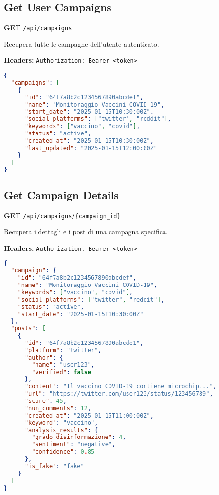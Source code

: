\documentclass[12pt,a4paper]{report}
\begin{document}
\subsection{Get User Campaigns}

\textbf{GET} \texttt{/api/campaigns}

Recupera tutte le campagne dell'utente autenticato.

\textbf{Headers:} \texttt{Authorization: Bearer <token>}

\begin{lstlisting}[language=json, caption=Response (200 OK)]
{
  "campaigns": [
    {
      "id": "64f7a8b2c1234567890abcdef",
      "name": "Monitoraggio Vaccini COVID-19",
      "start_date": "2025-01-15T10:30:00Z",
      "social_platforms": ["twitter", "reddit"],
      "keywords": ["vaccino", "covid"],
      "status": "active",
      "created_at": "2025-01-15T10:30:00Z",
      "last_updated": "2025-01-15T12:00:00Z"
    }
  ]
}
\end{lstlisting}

\subsection{Get Campaign Details}

\textbf{GET} \texttt{/api/campaigns/\{campaign\_id\}}

Recupera i dettagli e i post di una campagna specifica.

\textbf{Headers:} \texttt{Authorization: Bearer <token>}

\begin{lstlisting}[language=json, caption=Response (200 OK)]
{
  "campaign": {
    "id": "64f7a8b2c1234567890abcdef",
    "name": "Monitoraggio Vaccini COVID-19",
    "keywords": ["vaccino", "covid"],
    "social_platforms": ["twitter", "reddit"],
    "status": "active",
    "start_date": "2025-01-15T10:30:00Z"
  },
  "posts": [
    {
      "id": "64f7a8b2c1234567890abcde1",
      "platform": "twitter",
      "author": {
        "name": "user123",
        "verified": false
      },
      "content": "Il vaccino COVID-19 contiene microchip...",
      "url": "https://twitter.com/user123/status/123456789",
      "score": 45,
      "num_comments": 12,
      "created_at": "2025-01-15T11:00:00Z",
      "keyword": "vaccino",
      "analysis_results": {
        "grado_disinformazione": 4,
        "sentiment": "negative",
        "confidence": 0.85
      },
      "is_fake": "fake"
    }
  ]
}
\end{lstlisting}
\end{document}
